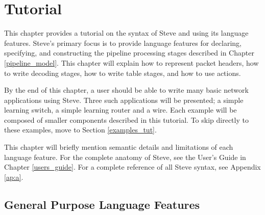 \chapter{Tutorial} \label{ch:tutorial}

This chapter provides a tutorial on the syntax of Steve and using its language features. Steve's primary focus is to provide language features for declaring, specifying, and constructing the pipeline processing stages described in Chapter \ref{pipeline_model}. This chapter will explain how to represent packet headers, how to write decoding stages, how to write table stages, and how to use actions.

By the end of this chapter, a user should be able to write many basic network applications using Steve. Three such applications will be presented; a simple learning switch, a simple learning router and a wire. Each example will be composed of smaller components described in this tutorial. To skip directly to these examples, move to Section \ref{examples_tut}.

This chapter will briefly mention semantic details and limitations of each language feature. For the complete anatomy of Steve, see the User's Guide in Chapter \ref{users_guide}. For a complete reference of all Steve syntax, see Appendix \ref{ap:a}.

\section{General Purpose Language Features} \label{gen_purp_tut}

